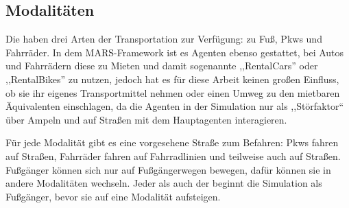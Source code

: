 %

\subsection{Modalitäten}\label{subsec:modalitaten}

Die  haben drei Arten der Transportation zur Verfügung: zu Fuß, Pkws und Fahrräder.
In dem MARS-Framework ist es Agenten ebenso gestattet, bei Autos und Fahrrädern diese zu Mieten und damit sogenannte ,,RentalCars'' oder ,,RentalBikes'' zu nutzen, jedoch hat es für diese Arbeit keinen großen Einfluss, ob sie ihr eigenes Transportmittel nehmen oder einen Umweg zu den mietbaren Äquivalenten einschlagen, da die Agenten in der Simulation nur als ,,Störfaktor`` über Ampeln und auf Straßen mit dem Hauptagenten interagieren.

Für jede Modalität gibt es eine vorgesehene Straße zum Befahren: Pkws fahren auf Straßen, Fahrräder fahren auf Fahrradlinien und teilweise auch auf Straßen.
Fußgänger können sich nur auf Fußgängerwegen bewegen, dafür können sie in andere Modalitäten wechseln.
Jeder  als auch der  beginnt die Simulation als Fußgänger, bevor sie auf eine Modalität aufsteigen.
